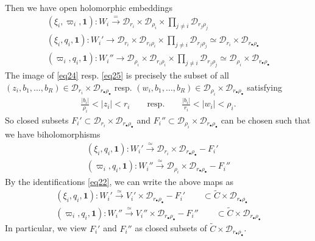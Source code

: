 \documentclass[11pt,b5paper,notitlepage]{article}
\theoremstyle{definition}
\theoremstyle{plain}
\newcommand{\mc}{\mathcal}
\newcommand{\wtd}{\widetilde}
\newcommand{\idt}{\mathbf{1}}
\newcommand{\blt}{\bullet}
\newcommand{\<}{\left\langle}
\renewcommand{\>}{\right\rangle}
\newcommand{\MD}{\mathcal{D}}
\numberwithin{equation}{section}
\begin{document}
Then we have open holomorphic embeddings
\begin{subequations}
\begin{gather}
(\xi_i,\varpi_i,\idt):W_i\xrightarrow{=} \MD_{r_i}\times \MD_{\rho_i}\times \prod_{j\ne i} \MD_{r_j\rho_j}  \label{eq23}\\
(\xi_i,q_i,\idt):W_i'\rightarrow \MD_{r_i}\times \MD_{r_i\rho_i}\times \prod_{j\ne i} \MD_{r_j\rho_j}\simeq \MD_{r_i}\times \MD_{r_\blt\rho_\blt}   \label{eq24}\\
(\varpi_i,q_i,\idt):W_i''\rightarrow \MD_{\rho_i}\times \MD_{r_i\rho_i}\times \prod_{j\ne i} \MD_{r_j\rho_j}\simeq \MD_{\rho_i}\times \MD_{r_\blt\rho_\blt}   \label{eq25}
\end{gather}
\end{subequations}
The image of \eqref{eq24} resp. \eqref{eq25} is precisely the subset of all $(z_i,b_1,\dots,b_R)\in \MD_{r_i}\times \MD_{r_\blt\rho_\blt}$ resp. $(w_i,b_1,\dots,b_R)\in \MD_{\rho_i}\times \MD_{r_\blt\rho_\blt}$ satisfying 
\begin{align*}
\frac{\vert b_i\vert }{\rho_i}<\vert z_i\vert <r_i \qquad \text{resp.}\qquad \frac{\vert b_i\vert }{r_i}<\vert w_i\vert <\rho_i.
\end{align*}
So closed subsets $F_i'\subset \MD_{r_i}\times \MD_{r_\blt\rho_\blt}$ and $F_i''\subset \MD_{\rho_i}\times \MD_{r_\blt\rho_\blt}$ can be chosen such that we have biholomorphisms
\begin{subequations}
\begin{gather}\label{geosew1}
(\xi_i,q_i,\idt):W_i'\xrightarrow{\simeq} \MD_{r_i}\times \MD_{r_\blt\rho_\blt}-F_i'\\
 (\varpi_i,q_i,\idt):W_i''\xrightarrow{\simeq} \MD_{\rho_i}\times \MD_{r_\blt\rho_\blt}-F_i''
\end{gather}
\end{subequations}
By the identifications \eqref{eq22}, we can write the above maps as
\begin{subequations}\label{eq26}
\begin{gather}
(\xi_i,q_i,\idt):W_i'\xrightarrow{\simeq} V_i'\times \MD_{r_\blt\rho_\blt}-F_i'\qquad \subset\wtd C\times\mc D_{r_\blt\rho_\blt}\\
 (\varpi_i,q_i,\idt):W_i''\xrightarrow{\simeq} V_i''\times \MD_{r_\blt\rho_\blt}-F_i''\qquad \subset \wtd C\times\mc D_{r_\blt\rho_\blt}
\end{gather}
\end{subequations}
In particular, we view $F_i'$ and $F_i''$ as closed subsets of $\wtd C\times \mc D_{r_\blt\rho_\blt}$.
\end{document}
